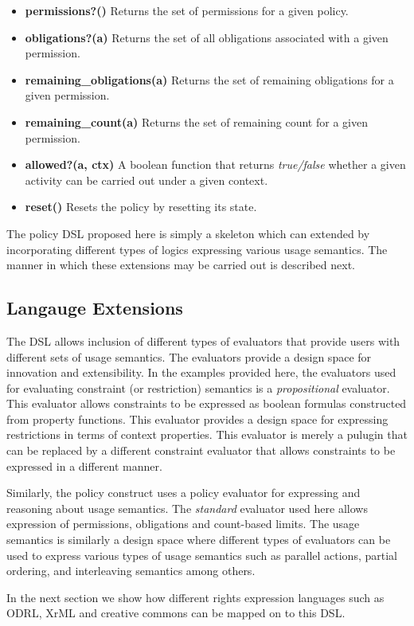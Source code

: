 \begin{itemize}
\item {\bf permissions?()} Returns the set of permissions for a given policy.
\item {\bf obligations?(a)} Returns the set of all obligations associated with a given permission. 
\item {\bf remaining\_obligations(a)} Returns the set of remaining obligations for a given permission. 
\item {\bf remaining\_count(a)} Returns the set of remaining count for a given permission. 
\item {\bf allowed?(a, ctx)} A boolean function that returns {\em true/false} whether a given activity can be carried out under a given context. 
\item {\bf reset()} Resets the policy by resetting its state. 
\end{itemize}

The policy DSL proposed here is simply a skeleton which can extended by incorporating different types of logics expressing various usage semantics. The manner in which these extensions may be carried out is described next. 

\subsection{Langauge Extensions}

The DSL allows inclusion of different types of evaluators that provide users with different sets of usage semantics. The evaluators provide a design space for innovation and extensibility. In the examples provided here, the evaluators used for evaluating constraint (or restriction) semantics is a {\em propositional} evaluator. This evaluator allows constraints to be expressed as boolean formulas constructed from property functions. This evaluator provides a design space for expressing restrictions in terms of context properties. This evaluator is merely a pulugin that can be replaced by a different constraint evaluator that allows constraints to be expressed in a different manner. 

Similarly, the policy construct uses a policy evaluator for expressing and reasoning about usage semantics. The {\em standard} evaluator used here allows expression of permissions, obligations and count-based limits. The usage semantics is similarly a design space where different types of evaluators can be used to express various types of usage semantics such as parallel actions, partial ordering, and interleaving semantics among others. 

In the next section we show how different rights expression languages such as ODRL, XrML and creative commons can be mapped on to this DSL. 




